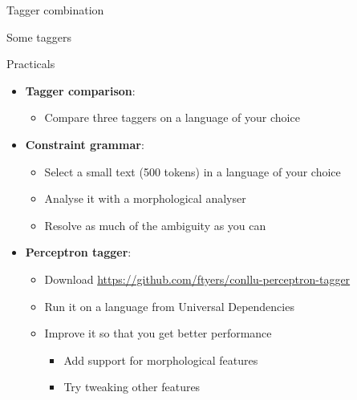 \documentclass{beamer}
\begin{document}
\begin{frame}{Tagger combination}



\end{frame}


\begin{frame}{Some taggers}




\end{frame}


 

\begin{frame}{Practicals}

\begin{itemize}
  \item \textbf{Tagger comparison}:
  \begin{itemize}
     \item Compare three taggers on a language of your choice
  \end{itemize}
  \item \textbf{Constraint grammar}: 
  \begin{itemize}
     \item Select a small text (500 tokens) in a language of your choice
     \item Analyse it with a morphological analyser
     \item Resolve as much of the ambiguity as you can
  \end{itemize}
  \item \textbf{Perceptron tagger}:
  \begin{itemize}
     \item Download \url{https://github.com/ftyers/conllu-perceptron-tagger}
     \item Run it on a language from Universal Dependencies
     \item Improve it so that you get better performance
     \begin{itemize}
       \item Add support for morphological features
       \item Try tweaking other features
     \end{itemize}
  \end{itemize}
\end{itemize}

\end{frame}
\end{document}
